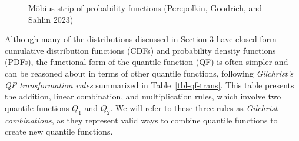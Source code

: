 \documentclass[
]{interact}
\begin{document}
\begin{figure}


\caption{\label{fig-moebius-chart}Möbius strip of probability functions
(Perepolkin, Goodrich, and Sahlin 2023)}

\end{figure}%

Although many of the distributions discussed in Section 3 have
closed-form cumulative distribution functions (CDFs) and probability
density functions (PDFs), the functional form of the quantile function
(QF) is often simpler and can be reasoned about in terms of other
quantile functions, following \emph{Gilchrist's QF transformation rules}
summarized in Table~\ref{tbl-qf-trans}. This table presents the
addition, linear combination, and multiplication rules, which involve
two quantile functions \(Q_1\) and \(Q_2\). We will refer to these three
rules as \emph{Gilchrist combinations}, as they represent valid ways to
combine quantile functions to create new quantile functions.
\end{document}
